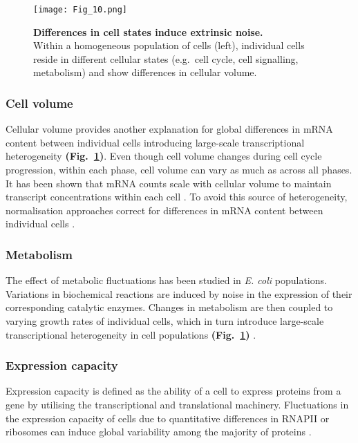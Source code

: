\begin{figure}[!h]
\centering
\texttt{[image: Fig\_10.png]}
\caption[Differences in cell states induce extrinsic noise]{\textbf{Differences in cell states induce extrinsic noise.}\\
Within a homogeneous population of cells (left), individual cells reside in different cellular states (e.g.~cell cycle, cell signalling, metabolism) and show differences in cellular volume.}
\label{fig0:extrinsic}
\end{figure} 

\vspace{-5mm}

\subsubsection{Cell volume}

Cellular volume provides another explanation for global differences in mRNA content between individual cells introducing large-scale transcriptional heterogeneity \textbf{(Fig.~\ref{fig0:extrinsic})}. Even though cell volume changes during cell cycle progression, within each phase, cell volume can vary as much as across all phases. It has been shown that mRNA counts scale with cellular volume to maintain transcript concentrations within each cell \citep{Kempe2015, Padovan-Merhar2015, Zhurinsky2010}. To avoid this source of heterogeneity, normalisation approaches correct for differences in mRNA content between individual cells \citep{Vallejos2017}.

\subsubsection{Metabolism}

The effect of metabolic fluctuations has been studied in \textit{E. coli} populations. Variations in biochemical reactions are induced by noise in the expression of their corresponding catalytic enzymes. Changes in metabolism are then coupled to varying growth rates of individual cells, which in turn introduce large-scale transcriptional heterogeneity in cell populations \textbf{(Fig.~\ref{fig0:extrinsic})} \citep{Kiviet2014}.  

\subsubsection{Expression capacity}

Expression capacity is defined as the ability of a cell to express proteins from a gene by utilising the transcriptional and translational machinery. Fluctuations in the expression capacity of cells due to quantitative differences in RNAPII or ribosomes can induce global variability among the majority of proteins \citep{Colman-Lerner2005}.

